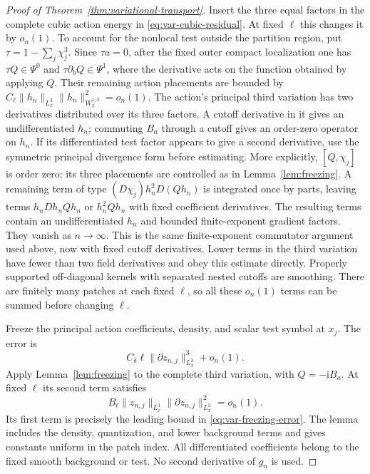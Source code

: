 \documentclass[11pt,a4paper]{article}
\numberwithin{equation}{section}
\newcommand{\ii}{\mathrm{i}}
\theoremstyle{definition}
\begin{document}
\begin{proof}[Proof of Theorem~\ref{thm:variational-transport}]
Insert the three equal factors in the complete cubic action energy in
\eqref{eq:var-cubic-residual}. At fixed $\ell$ this changes it by
$o_n(1)$. To account for the nonlocal test outside the partition region,
put $\tau=1-\sum_j\chi_j^3$. Since $\tau a=0$, after the fixed outer
compact localization one has $\tau Q\in\Psi^0$ and
$\tau\partial_bQ\in\Psi^1$, where the derivative acts on the function obtained by applying $Q$. Their remaining action placements are bounded by
$C_\ell\|h_n\|_{L^3_x}\|h_n\|_{W^{1,3}_x}^2=o_n(1)$.
The action's principal third variation has two derivatives
distributed over its three factors. A cutoff derivative in it gives an
undifferentiated $h_n$; commuting $B_a$ through a cutoff gives an
order-zero operator on $h_n$. If its differentiated test factor appears
to give a second derivative, use the symmetric principal divergence
form before estimating. More explicitly, $[Q,\chi_j]$ is order zero;
its three placements are controlled as in Lemma~\ref{lem:freezing}.
A remaining term of type $(D\chi_j)h_n^2D(Qh_n)$ is integrated once
by parts, leaving terms $h_nDh_nQh_n$ or $h_n^2Qh_n$ with fixed
coefficient derivatives. The resulting terms contain an undifferentiated
$h_n$ and bounded finite-exponent gradient factors. They vanish as
$n\to\infty$. This is the same finite-exponent commutator argument
used above, now with fixed cutoff derivatives. Lower terms in the third
variation have fewer than two field derivatives and obey this estimate
directly. Properly supported off-diagonal kernels with separated nested
cutoffs are smoothing. There are finitely many patches at each fixed
$\ell$, so all these $o_n(1)$ terms can be summed before changing
$\ell$.

Freeze the principal action coefficients, density, and scalar test
symbol at $x_j$. The error is
\begin{equation}\label{eq:var-freezing-error}
C_\delta\ell\|\partial z_{n,j}\|_{L^3_x}^3+o_n(1).
\end{equation}
Apply Lemma~\ref{lem:freezing} to the complete third variation, with
$Q=-\ii B_a$. At fixed $\ell$ its second term satisfies
\begin{equation*}
B_\ell\|z_{n,j}\|_{L^3_x}\|\partial z_{n,j}\|_{L^3_x}^2=o_n(1).
\end{equation*}
Its first term is precisely the leading bound in
\eqref{eq:var-freezing-error}. The lemma includes the density,
quantization, and lower background terms and gives constants uniform
in the patch index. All differentiated coefficients belong to the
fixed smooth background or test. No second derivative of $g_n$ is used.


\end{proof}
\end{document}
